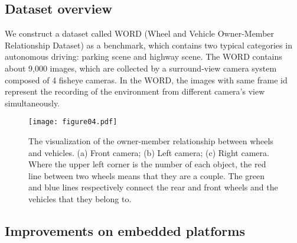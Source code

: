 \documentclass{article}
\begin{document}
\subsection{Dataset overview}
We construct a dataset called WORD (Wheel and Vehicle Owner-Member Relationship Dataset) as a benchmark, which contains two typical categories in autonomous driving: parking scene and highway scene. The WORD contains about 9,000 images, which are collected by a surround-view camera system composed of 4 fisheye cameras. In the WORD, the images with same frame id represent the recording of the environment from different camera's view simultaneously.
%  
\begin{figure*}[!t]
    \centering
    \texttt{[image: figure04.pdf]}
    \caption{The visualization of the owner-member relationship between wheels and vehicles. (a) Front camera; (b) Left camera; (c) Right camera. Where the upper left corner  is the number of each object, the red line between two wheels means that they are a couple. The green and blue lines respectively connect the rear and front wheels and the vehicles that they belong to.}
    \label{fig:Figure04}
\end{figure*}





\subsection{Improvements on embedded platforms}
\end{document}
